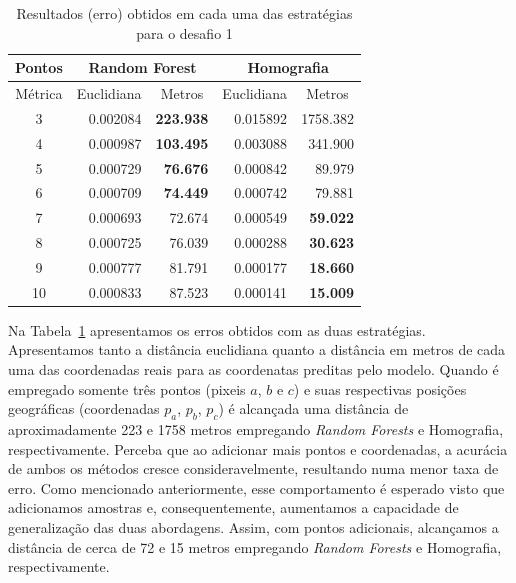 \documentclass[12pt]{report}
\begin{document}
{\begin{table}[!h]
	\centering
	\scriptsize
    \begin{tabular}{c|rr|rr}
		\textbf{Pontos} & \multicolumn{2}{c|}{\textbf{Random Forest}}                & \multicolumn{2}{c}{\textbf{Homografia}}                     \\ \hline
		Métrica         & Euclidiana                   & \multicolumn{1}{c|}{Metros} & \multicolumn{1}{c}{Euclidiana} & \multicolumn{1}{c}{Metros} \\ \hline\hline
		3               & 0.002084                     & \textbf{223.938}            & 0.015892                       & 1758.382                   \\
		4               & 0.000987                     & \textbf{103.495}            & 0.003088                       & 341.900                    \\
		5               & 0.000729                     & \textbf{76.676}             & 0.000842                       & 89.979                     \\
		6               & 0.000709                     & \textbf{74.449}             & 0.000742                       & 79.881                     \\
		7               & 0.000693                     & 72.674                      & 0.000549                       & \textbf{59.022}            \\
		8               & 0.000725                     & 76.039                      & 0.000288                       & \textbf{30.623}            \\
		9               & 0.000777                     & 81.791                      & 0.000177                       & \textbf{18.660}            \\
		10              & 0.000833                     & 87.523                      & 0.000141                       & \textbf{15.009}            \\ \hline     
    \end{tabular}
    \caption{Resultados (erro) obtidos em cada uma das estratégias para o desafio 1}
    \label{tab:results1}
\end{table}

Na Tabela~\ref{tab:results1} apresentamos os erros obtidos com as duas estratégias.
Apresentamos tanto a distância euclidiana quanto a distância em metros de cada uma das coordenadas reais para as coordenatas preditas pelo modelo.
Quando é empregado somente três pontos (pixeis $a$, $b$ e $c$) e suas respectivas posições geográficas (coordenadas $p_{a}$, $p_{b}$, $p_{c}$) é alcançada uma distância de aproximadamente 223 e 1758 metros empregando \textit{Random Forests} e Homografia, respectivamente.
Perceba que ao adicionar mais pontos e coordenadas, a acurácia de ambos os métodos cresce consideravelmente, resultando numa menor taxa de erro.
Como mencionado anteriormente, esse comportamento é esperado visto que adicionamos amostras e, consequentemente, aumentamos a capacidade de generalização das duas abordagens. 
Assim, com pontos adicionais, alcançamos a distância de cerca de 72 e 15 metros empregando \textit{Random Forests} e Homografia, respectivamente.

}
\end{document}
